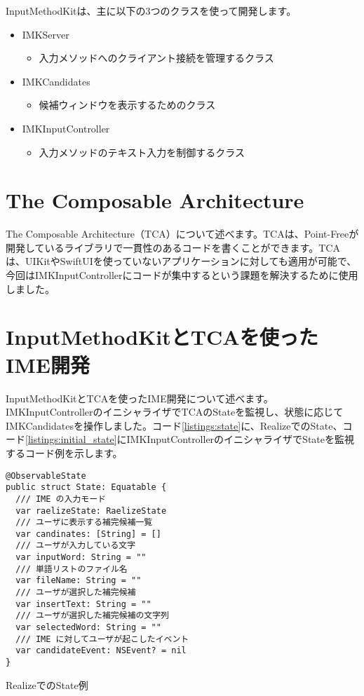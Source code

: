 \documentclass[uplatex,a4j,12pt,twocolumn]{jsarticle}
\begin{document}
InputMethodKitは、主に以下の3つのクラスを使って開発します。
\begin{itemize}
    \item IMKServer
    \begin{itemize}
        \item 入力メソッドへのクライアント接続を管理するクラス\cite{bib:imkserver}
    \end{itemize}
    \item IMKCandidates
    \begin{itemize}
        \item 候補ウィンドウを表示するためのクラス\cite{bib:imk_candidates}
    \end{itemize}
    \item IMKInputController
    \begin{itemize}
        \item 入力メソッドのテキスト入力を制御するクラス\cite{bib:imk_input_controller}
    \end{itemize}
\end{itemize}


\section{The Composable Architecture}\label{sec:the_composable_architecture}
The Composable Architecture（TCA）について述べます。TCAは、Point-Freeが開発しているライブラリで一貫性のあるコードを書くことができます。TCAは、UIKitやSwiftUIを使っていないアプリケーションに対しても適用が可能で、今回はIMKInputControllerにコードが集中するという課題を解決するために使用しました。

\section{InputMethodKitとTCAを使ったIME開発}\label{sec:use_imk_and_tca}
InputMethodKitとTCAを使ったIME開発について述べます。IMKInputControllerのイニシャライザでTCAのStateを監視し、状態に応じてIMKCandidatesを操作しました。コード\ref{listings:state}に、RealizeでのState、コード\ref{listings:initial_state}にIMKInputControllerのイニシャライザでStateを監視するコード例を示します。

\begin{listing}[h]
  \begin{verbatim}
@ObservableState
public struct State: Equatable {
  /// IME の入力モード
  var raelizeState: RaelizeState
  /// ユーザに表示する補完候補一覧
  var candinates: [String] = []
  /// ユーザが入力している文字
  var inputWord: String = ""
  /// 単語リストのファイル名
  var fileName: String = ""
  /// ユーザが選択した補完候補
  var insertText: String = ""
  /// ユーザが選択した補完候補の文字列
  var selectedWord: String = ""
  /// IME に対してユーザが起こしたイベント
  var candidateEvent: NSEvent? = nil
}
  \end{verbatim}
  \caption{RealizeでのState例}\label{listings:state}
\end{listing}
\end{document}
